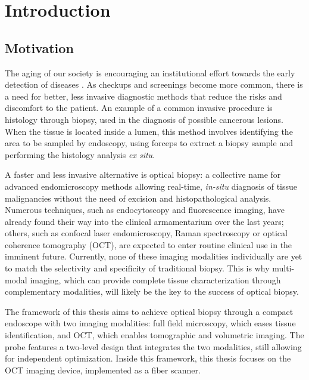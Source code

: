 %

\chapter{Introduction}
\label{Ch:Introduction}


\section{Motivation}
The aging of our society is encouraging an institutional effort towards the early detection of diseases \cite{Fendrich2007}. As checkups and screenings become more common, there is a need for better, less invasive diagnostic methods that reduce the risks and discomfort to the patient. An example of a common invasive procedure is histology through biopsy, used in the diagnosis of possible cancerous lesions. When the tissue is located inside a lumen, this method involves identifying the area to be sampled by endoscopy, using forceps to extract a biopsy sample and performing the histology analysis \textit{ex situ}. 

A faster and less invasive alternative is optical biopsy: a collective name for advanced endomicroscopy methods allowing real-time, \textit{in-situ} diagnosis of tissue malignancies without the need of excision and histopathological analysis. Numerous techniques, such as endocytoscopy and fluorescence imaging, have already found their way into the clinical armamentarium over the last years; others, such as confocal laser endomicroscopy\cite{Jabbour2013}, Raman spectroscopy \cite{Bergholt2011} or optical coherence tomography (OCT)\cite{Park2012,Sun2011}, are expected to enter routine clinical use in the imminent future. Currently, none of these imaging modalities individually are yet to match the selectivity and specificity of traditional biopsy. This is why multi-modal imaging, which can provide complete tissue characterization through complementary modalities, will likely be the key to the success of optical biopsy.

The framework of this thesis aims to achieve optical biopsy through a compact endoscope with two imaging modalities: full field microscopy, which eases tissue identification, and OCT, which enables tomographic and volumetric imaging. The probe features a two-level design that integrates the two modalities, still allowing for independent optimization. 
Inside this framework, this thesis focuses on the OCT imaging device, implemented as a fiber scanner.

